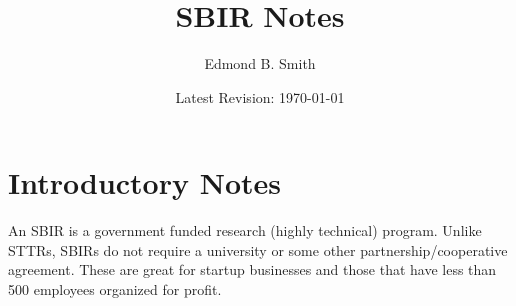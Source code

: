 \documentclass[10pt]{article}
\title{SBIR Notes}
\author{Edmond B. Smith}
\date{\small{Latest Revision: \today}}
\begin{document}
	\maketitle
	\tableofcontents
	\newpage
	\section{Introductory Notes}
	An SBIR is a government funded research (highly technical) program. Unlike STTRs, SBIRs do not require a university or some other partnership/cooperative agreement. These are great for startup businesses and those that have less than 500 employees organized for profit.
\end{document}
